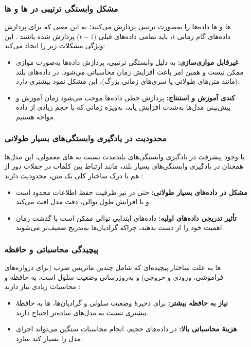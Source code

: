 \subsubsection{مشکل وابستگی ترتیبی در ها و ها}
ها و ها داده‌ها را به‌صورت ترتیبی پردازش می‌کنند؛ به این معنی که برای پردازش داده‌های گام زمانی \( t \)، باید تمامی داده‌های قبلی (\( t-1 \)) پردازش شده باشند
\cite{rumelhart1986learning,hochreiter1997long}.
این ویژگی مشکلات زیر را ایجاد می‌کند:
\begin{itemize}
	\item \textbf{غیرقابل موازی‌سازی:}  
	به دلیل وابستگی ترتیبی، پردازش داده‌ها به‌صورت موازی ممکن نیست و همین امر باعث افزایش زمان محاسباتی می‌شود. در داده‌های بلند (مانند متن‌های طولانی یا سری‌های زمانی بزرگ)، این مشکل نمود بیشتری دارد.
	
	\item \textbf{کندی آموزش و استنتاج:}  
	پردازش خطی داده‌ها موجب می‌شود زمان آموزش و پیش‌بینی مدل‌ها به‌شدت افزایش یابد، به‌ویژه زمانی که با حجم زیادی از داده مواجه هستیم.
\end{itemize}

\subsubsection{محدودیت در یادگیری وابستگی‌های بسیار طولانی}
با وجود پیشرفت  در یادگیری وابستگی‌های بلندمدت نسبت به های معمولی، این مدل‌ها همچنان در یادگیری وابستگی‌های بسیار بلند، مانند ارتباط بین کلمات در جملات دور از هم یا درک ساختار کلی یک متن، محدودیت دارند
\cite{hochreiter1998vanishing}:
\begin{itemize}
	\item \textbf{مشکل در داده‌های بسیار طولانی:}  
	حتی در  نیز ظرفیت حفظ اطلاعات محدود است و با افزایش طول توالی، دقت مدل افت می‌کند.
	
	\item \textbf{تأثیر تدریجی داده‌های اولیه:}  
	داده‌های ابتدایی توالی ممکن است با گذشت زمان اهمیت خود را از دست بدهند، چراکه گرادیان‌ها به‌تدریج ضعیف‌تر می‌شوند.
\end{itemize}

\subsubsection{پیچیدگی محاسباتی و حافظه}
ها به علت ساختار پیچیده‌ای که شامل چندین ماتریس ضرب (برای دروازه‌های فراموشی، ورودی و خروجی) و به‌روزرسانی وضعیت سلول است، به حافظه و محاسبات زیادی نیاز دارند
\cite{goodfellow2016deep}:
\begin{itemize}
	\item \textbf{نیاز به حافظه بیشتر:}  
	برای ذخیرهٔ وضعیت سلولی و گرادیان‌ها، ها به حافظهٔ بیشتری نسبت به مدل‌های ساده‌تر احتیاج دارند.
	
	\item \textbf{هزینهٔ محاسباتی بالا:}  
	در داده‌های حجیم، انجام محاسبات سنگین می‌تواند اجرای مدل را بسیار کند سازد.
\end{itemize}

